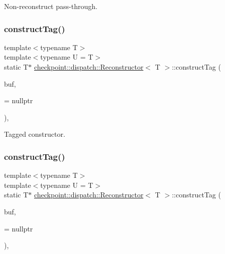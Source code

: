 Non-\/reconstruct pass-\/through. 

\mbox{\label{structcheckpoint_1_1dispatch_1_1_reconstructor_ac702decacef9a6ef4d0cf5492187b9ab}} 
\subsubsection{\texorpdfstring{construct\+Tag()}{constructTag()}\hspace{0.1cm}{\footnotesize\ttfamily [1/2]}}
{\footnotesize\ttfamily template$<$typename T$>$ \\
template$<$typename U  = T$>$ \\
static T$\ast$ \hyperlink{structcheckpoint_1_1dispatch_1_1_reconstructor}{checkpoint\+::dispatch\+::\+Reconstructor}$<$ T $>$\+::construct\+Tag (\begin{DoxyParamCaption}\item[{void $\ast$}]{buf,  }\item[{\hyperlink{namespacecheckpoint_abff0f367c546c94ce857d200153d990f}{is\+Tagged\+Constructible\+Type}$<$ U $>$ $\ast$}]{ = {\ttfamily nullptr} }\end{DoxyParamCaption})\hspace{0.3cm}{\ttfamily [inline]}, {\ttfamily [static]}}



Tagged constructor. 

\mbox{\label{structcheckpoint_1_1dispatch_1_1_reconstructor_a116025ae56a26ed4d6a51b999f57fd47}} 
\subsubsection{\texorpdfstring{construct\+Tag()}{constructTag()}\hspace{0.1cm}{\footnotesize\ttfamily [2/2]}}
{\footnotesize\ttfamily template$<$typename T$>$ \\
template$<$typename U  = T$>$ \\
static T$\ast$ \hyperlink{structcheckpoint_1_1dispatch_1_1_reconstructor}{checkpoint\+::dispatch\+::\+Reconstructor}$<$ T $>$\+::construct\+Tag (\begin{DoxyParamCaption}\item[{void $\ast$}]{buf,  }\item[{\hyperlink{namespacecheckpoint_a4eb64ee16bff7ef1609e5b98cb16cfb6}{is\+Not\+Tagged\+Constructible\+Type}$<$ U $>$ $\ast$}]{ = {\ttfamily nullptr} }\end{DoxyParamCaption})\hspace{0.3cm}{\ttfamily [inline]}, {\ttfamily [static]}}



